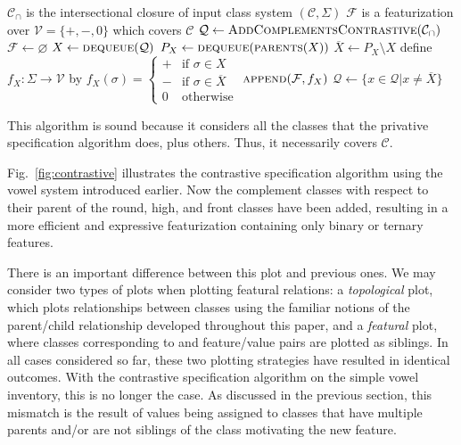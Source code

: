 \documentclass[11pt, oneside]{article}   	%
\begin{document}
\vspace{\baselineskip} \noindent \begin{algorithmic}
    \REQUIRE $\mathcal C_\cap$ is the intersectional closure of input class system $(\mathcal C, \Sigma)$
    \ENSURE $\mathcal F$ is a featurization over $\mathcal V = \{ +, -, 0 \}$ which covers $\mathcal C$
    \STATE
    \STATE $\mathcal Q \leftarrow \textsc{AddComplementsContrastive}(\mathcal{C_\cap})$
    \STATE $\mathcal F \leftarrow \varnothing$
    \STATE
        \STATE $X \leftarrow \textsc{dequeue}(\mathcal Q)$
            \STATE $P_X \leftarrow \textsc{dequeue}(\textsc{parents}(X))$
            \STATE $\overline{X} \leftarrow P_X \setminus X$
            \STATE define $f_X : \Sigma \rightarrow \mathcal V$ by $f_X (\sigma) = \begin{cases}
                    + & \text{if } \sigma \in X \\
                    - & \text{if } \sigma \in \overline{X} \\
                    0 & \text{otherwise}
                    \end{cases}$
            \STATE $\textsc{append}(\mathcal F, f_X)$
            \STATE $\mathcal{Q} \leftarrow \{x \in \mathcal{Q} \vert x \neq \overline{X} \}$
        \ENDIF
    \ENDWHILE
\end{algorithmic}

\vspace{\baselineskip} \noindent This algorithm is sound because it considers all the classes that the privative specification algorithm does, plus others. Thus, it necessarily covers $\mathcal C$.

Fig.~\ref{fig:contrastive} illustrates the contrastive specification algorithm using the vowel system introduced earlier. Now the complement classes with respect to their parent of the round, high, and front classes have been added, resulting in a more efficient and expressive featurization containing only binary or ternary features.

There is an important difference between this plot and previous ones. We may consider two types of plots when plotting featural relations: a \emph{topological} plot, which plots relationships between classes using the familiar notions of the parent/child relationship developed throughout this paper, and a \emph{featural} plot, where classes corresponding to  and  feature/value pairs are plotted as siblings. In all cases considered so far, these two plotting strategies have resulted in identical outcomes. With the contrastive specification algorithm on the simple vowel inventory, this is no longer the case. As discussed in the previous section, this mismatch is the result of  values being assigned to classes that have multiple parents and/or are not siblings of the class motivating the new feature.
\end{document}
